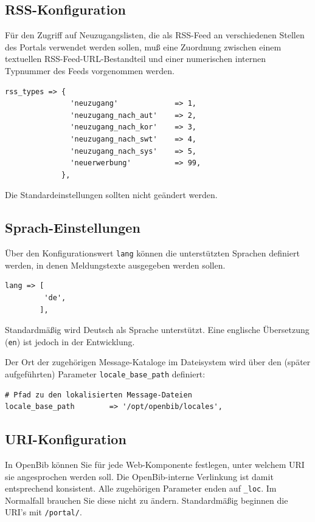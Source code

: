\documentclass[11pt, twoside, a4paper, BCOR8mm, DIV12, bibtotoc,idxtotoc]{scrbook}
\begin{document}
\subsection{RSS-Konfiguration}

Für den Zugriff auf Neuzugangslisten, die als RSS-Feed an
verschiedenen Stellen des Portals verwendet werden sollen, muß eine
Zuordnung zwischen einem textuellen RSS-Feed-URL-Bestandteil und einer
numerischen internen Typnummer des Feeds vorgenommen werden.

\begin{verbatim}
rss_types => {
               'neuzugang'             => 1,
               'neuzugang_nach_aut'    => 2,
               'neuzugang_nach_kor'    => 3,
               'neuzugang_nach_swt'    => 4,
               'neuzugang_nach_sys'    => 5,
               'neuerwerbung'          => 99,
             },
\end{verbatim}

Die Standardeinstellungen sollten nicht geändert werden.


\subsection{Sprach-Einstellungen}

Über den Konfigurationswert \texttt{lang} können die unterstützten
Sprachen definiert werden, in denen Meldungstexte ausgegeben werden
sollen.

\begin{verbatim}
lang => [
         'de',
        ],
\end{verbatim}

Standardmäßig wird Deutsch als Sprache unterstützt. Eine englische
Übersetzung (\texttt{en}) ist jedoch in der Entwicklung.

Der Ort der zugehörigen Message-Kataloge im Dateisystem wird über den
(später aufgeführten) Parameter \texttt{locale\_base\_path} definiert:

\begin{verbatim}
# Pfad zu den lokalisierten Message-Dateien
locale_base_path        => '/opt/openbib/locales',
\end{verbatim}

\subsection{URI-Konfiguration}

In OpenBib können Sie für jede Web-Komponente festlegen, unter
welchem URI sie angesprochen werden soll. Die OpenBib-interne
Verlinkung ist damit entsprechend konsistent. Alle zugehörigen
Parameter enden auf \texttt{\_loc}. Im Normalfall brauchen Sie diese
nicht zu ändern. Standardmäßig beginnen die URI's mit \texttt{/portal/}.
\end{document}
